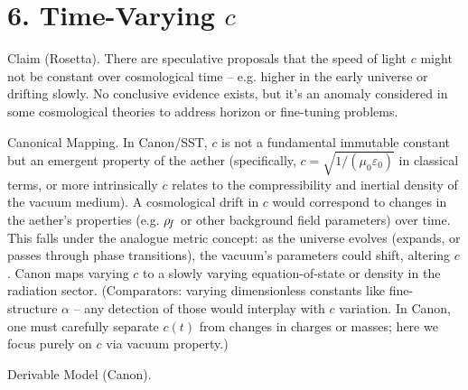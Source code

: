 \documentclass[11pt]{article}
\begin{document}
\section*{6. Time-Varying $c$}

Claim (Rosetta). There are speculative proposals that the speed of light $c$ might not be constant over cosmological time – e.g. higher in the early universe or drifting slowly. No conclusive evidence exists, but it’s an anomaly considered in some cosmological theories to address horizon or fine-tuning problems.


Canonical Mapping. In Canon/SST, $c$ is not a fundamental immutable constant but an emergent property of the aether (specifically, $c = \sqrt{1/(\mu_0 \varepsilon_0)}$ in classical terms, or more intrinsically $c$ relates to the compressibility and inertial density of the vacuum medium). A cosmological drift in $c$ would correspond to changes in the aether’s properties (e.g. $\rho_{\!f}$ or other background field parameters) over time. This falls under the analogue metric concept: as the universe evolves (expands, or passes through phase transitions), the vacuum’s parameters could shift, altering $c$. Canon maps varying $c$ to a slowly varying equation-of-state or density in the radiation sector. (Comparators: varying dimensionless constants like fine-structure $\alpha$ – any detection of those would interplay with $c$ variation. In Canon, one must carefully separate $c(t)$ from changes in charges or masses; here we focus purely on $c$ via vacuum property.)


Derivable Model (Canon).
\end{document}
